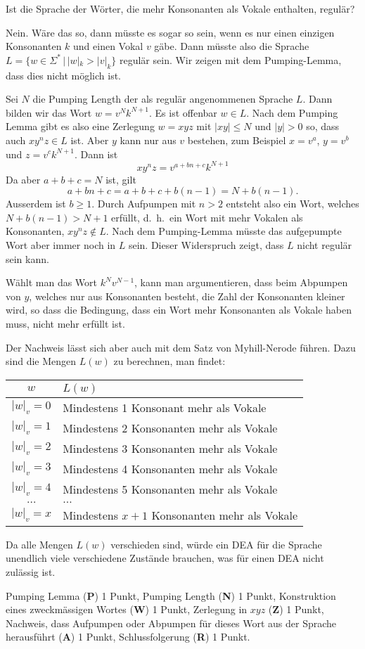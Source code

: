 Ist die Sprache der Wörter, die mehr Konsonanten als Vokale enthalten,
regulär?

\begin{loesung}
Nein. Wäre das so, dann müsste es sogar so sein, wenn es nur einen
einzigen Konsonanten $k$ und einen Vokal $v$ gäbe.
Dann müsste also die Sprache $L=\{ w\in\Sigma^*\,|\, |w|_k > |v|_k\}$
regulär sein. Wir zeigen mit dem Pumping-Lemma, dass dies nicht möglich
ist.

Sei $N$ die Pumping Length der als regulär angenommenen Sprache $L$.
Dann bilden wir das Wort $w=v^{N}k^{N+1}$. Es ist offenbar $w\in L$.
Nach dem Pumping Lemma gibt es also eine Zerlegung $w=xyz$ mit
$|xy|\le N$ und $|y|>0$ so, dass auch $xy^nz\in L$ ist.
Aber $y$ kann nur aus $v$ bestehen, zum Beispiel $x=v^a$, $y=v^b$ und
$z=v^ck^{N+1}$. Dann ist
\[
xy^nz=v^{a+bn+c}k^{N+1}
\]
Da aber $a+b+c=N$ ist, gilt
\[
a+bn+c=a+b+c + b(n-1)=N+b(n-1).
\]
Ausserdem ist $b\ge 1$.
Durch Aufpumpen mit $n> 2$ entsteht also ein Wort, welches
$N+b(n-1)> N+1$ erfüllt, d.~h.~ein Wort mit mehr Vokalen als
Konsonanten, $xy^nz\not\in L$. Nach dem Pumping-Lemma müsste das
aufgepumpte Wort aber immer noch in $L$ sein. Dieser Widerspruch
zeigt, dass $L$ nicht regulär sein kann.

Wählt man das Wort $k^Nv^{N-1}$, kann man argumentieren, dass
beim Abpumpen von $y$, welches nur aus Konsonanten besteht, die
Zahl der Konsonanten kleiner wird, so dass die Bedingung, dass ein
Wort mehr Konsonanten als Vokale haben muss, nicht mehr erfüllt ist.

Der Nachweis lässt sich aber auch mit dem Satz von Myhill-Nerode
führen. Dazu sind die Mengen $L(w)$ zu berechnen, man findet:
\begin{center}
\begin{tabular}{|c|l|}
\hline
$w$&$L(w)$\\
\hline
$|w|_v=0$&Mindestens 1 Konsonant mehr als Vokale\\
$|w|_v=1$&Mindestens 2 Konsonanten mehr als Vokale\\
$|w|_v=2$&Mindestens 3 Konsonanten mehr als Vokale\\
$|w|_v=3$&Mindestens 4 Konsonanten mehr als Vokale\\
$|w|_v=4$&Mindestens 5 Konsonanten mehr als Vokale\\
$\dots$&$\dots$\\
$|w|_v=x$&Mindestens $x+1$ Konsonanten mehr als Vokale\\
\hline
\end{tabular}
\end{center}
Da alle Mengen $L(w)$ verschieden sind, würde ein DEA für die Sprache
unendlich viele verschiedene Zustände brauchen, was für einen
DEA nicht zulässig ist.
\end{loesung}

\begin{bewertung}
Pumping Lemma ({\bf P}) 1 Punkt,
Pumping Length ({\bf N}) 1 Punkt,
Konstruktion eines zweckmässigen Wortes ({\bf W}) 1 Punkt,
Zerlegung in $xyz$ ({\bf Z}) 1 Punkt,
Nachweis, dass Aufpumpen oder Abpumpen für dieses Wort aus der Sprache
herausführt
({\bf A}) 1 Punkt,
Schlussfolgerung ({\bf R}) 1 Punkt.
\end{bewertung}

